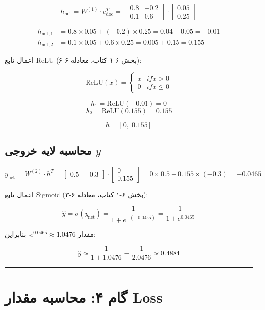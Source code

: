 \documentclass[11pt,a4paper]{article}
\newcommand{\en}[1]{\textenglish{#1}}
\newcommand{\separator}{\vspace{1em}\noindent\rule{\linewidth}{0.4pt}\vspace{1em}}
\begin{document}
\[
h_{\text{net}} = W^{(1)} \cdot e_{\text{doc}}^T = 
\begin{bmatrix}
0.8 & -0.2 \\
0.1 & 0.6
\end{bmatrix}
\cdot
\begin{bmatrix}
0.05 \\
0.25
\end{bmatrix}
\]

\begin{align*}
h_{\text{net},1} &= 0.8 \times 0.05 + (-0.2) \times 0.25 = 0.04 - 0.05 = -0.01 \\
h_{\text{net},2} &= 0.1 \times 0.05 + 0.6 \times 0.25 = 0.005 + 0.15 = 0.155
\end{align*}

اعمال تابع \en{ReLU} (بخش \en{۶-۱} کتاب، معادله \en{۶-۶}):

\[
\text{ReLU}(x) = 
\begin{cases} 
x & if x > 0 \\
0 & if x \le 0
\end{cases}
\]

\[
h_1 = \text{ReLU}(-0.01) = 0
\]
\[
h_2 = \text{ReLU}(0.155) = 0.155
\]

\[
h = [0, \; 0.155]
\]

\subsection{محاسبه لایه خروجی \(y\)}

\[
y_{\text{net}} = W^{(2)} \cdot h^T = 
\begin{bmatrix}
0.5 & -0.3
\end{bmatrix}
\cdot
\begin{bmatrix}
0 \\
0.155
\end{bmatrix}
= 0 \times 0.5 + 0.155 \times (-0.3) = -0.0465
\]

اعمال تابع \en{Sigmoid} (بخش \en{۶-۱} کتاب، معادله \en{۶-۳}):

\[
\hat{y} = \sigma(y_{\text{net}}) = \frac{1}{1 + e^{-(-0.0465)}} = \frac{1}{1 + e^{0.0465}}
\]

مقدار \(e^{0.0465} \approx 1.0476\)، بنابراین:

\[
\hat{y} \approx \frac{1}{1 + 1.0476} = \frac{1}{2.0476} \approx 0.4884
\]

\separator
\section{گام ۴: محاسبه مقدار \en{Loss}}
\end{document}
